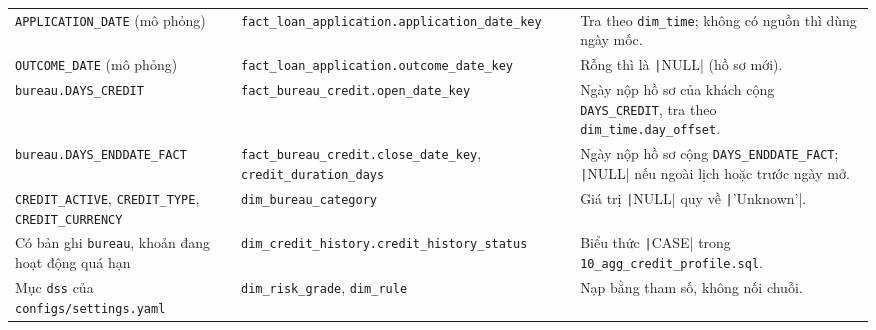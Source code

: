 \begin{table}[H]
\begin{tabular}{p{4.6cm} p{5.4cm} p{5.4cm}}
		\texttt{APPLICATION\_DATE} (mô phỏng)                                     & \texttt{fact\_loan\_application.}\allowbreak\texttt{application\_date\_key}                                                   & Tra theo \texttt{dim\_time}; không có nguồn thì dùng ngày mốc.                                                                      \\
		\texttt{OUTCOME\_DATE} (mô phỏng)                                         & \texttt{fact\_loan\_application.}\allowbreak\texttt{outcome\_date\_key}                                                       & Rỗng thì là \texttt|NULL| (hồ sơ mới).                                                             \\
		\texttt{bureau.DAYS\_CREDIT}                                              & \texttt{fact\_bureau\_credit.}\allowbreak\texttt{open\_date\_key}                                                             & Ngày nộp hồ sơ của khách cộng \texttt{DAYS\_CREDIT}, tra theo \texttt{dim\_time.day\_offset}.                                       \\
		\texttt{bureau.}\allowbreak\texttt{DAYS\_ENDDATE\_FACT}                   & \texttt{fact\_bureau\_credit.}\allowbreak\texttt{close\_date\_key}, \texttt{credit\_duration\_days}                           & Ngày nộp hồ sơ cộng \texttt{DAYS\_ENDDATE\_FACT}; \texttt|NULL| nếu ngoài lịch hoặc trước ngày mở. \\
		\texttt{CREDIT\_ACTIVE}, \texttt{CREDIT\_TYPE}, \texttt{CREDIT\_CURRENCY} & \texttt{dim\_bureau\_category}                                                                                                & Giá trị \texttt|NULL| quy về \texttt|'Unknown'|.                  \\
		Có bản ghi \texttt{bureau}, khoản đang hoạt động quá hạn                  & \texttt{dim\_credit\_history.}\allowbreak\texttt{credit\_history\_status}                                                     & Biểu thức \texttt|CASE| trong \texttt{10\_agg\_credit\_profile.sql}.                               \\
		Mục \texttt{dss} của \texttt{configs/settings.yaml}                       & \texttt{dim\_risk\_grade}, \texttt{dim\_rule}                                                                                 & Nạp bằng tham số, không nối chuỗi.                                                                                                  \\
		\bottomrule
	\end{tabular}
\end{table}

